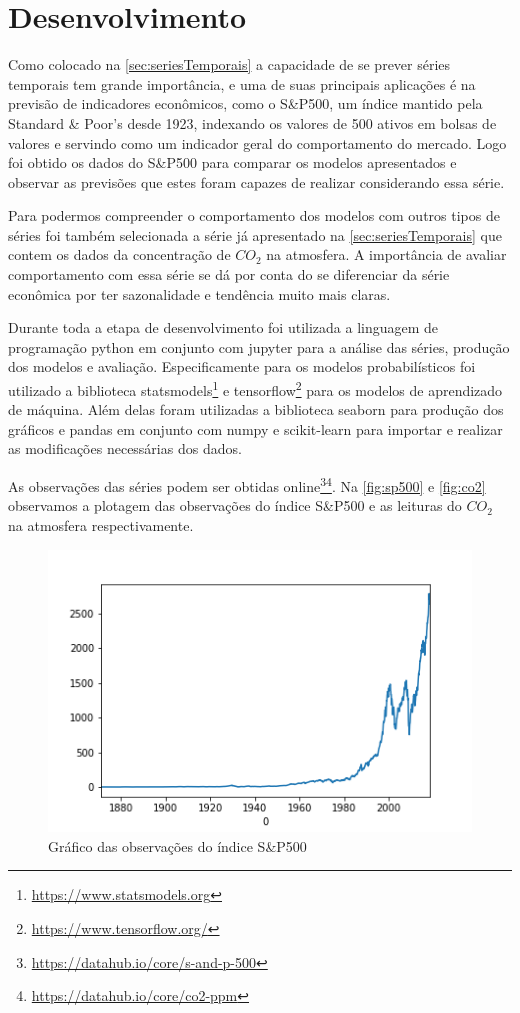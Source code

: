 \documentclass[
    12pt,
    oneside,
    a4paper,
    english,
    brazil
]{abntex2}
\begin{document}
\chapter{Desenvolvimento}\label{chap:desenv}
Como colocado na \autoref{sec:seriesTemporais} a capacidade de se prever séries temporais tem  grande importância,  e uma  de suas  principais aplicações  é na
previsão  de indicadores  econômicos, como  o S\&P500,  um índice  mantido pela
Standard \& Poor's desde 1923, indexando os  valores de 500 ativos em bolsas de
valores e  servindo como um indicador  geral do comportamento do  mercado. Logo
foi obtido os dados do S\&P500 para comparar os modelos apresentados e observar
as previsões que estes foram capazes de realizar considerando essa série.

Para   podermos   compreender   o   comportamento  dos   modelos   com   outros
tipos   de  séries   foi  também   selecionada  a   série  já   apresentado  na
\autoref{sec:seriesTemporais} que contem os dados  da concentração de $CO_2$ na
atmosfera. A  importância de  avaliar comportamento  com essa  série se  dá por
conta do  se diferenciar da  série econômica  por ter sazonalidade  e tendência
muito mais claras.

Durante  toda  a  etapa  de   desenvolvimento  foi  utilizada  a  linguagem  de
programação python em conjunto com jupyter  para a análise das séries, produção
dos modelos  e avaliação. Especificamente  para os modelos  probabilísticos foi
utilizado a  biblioteca statsmodels\footnote{\url{https://www.statsmodels.org}}
e  tensorflow\footnote{\url{https://www.tensorflow.org/}}  para os  modelos  de
aprendizado de máquina.  Além delas foram utilizadas a  biblioteca seaborn para
produção  dos gráficos  e  pandas em  conjunto com  numpy  e scikit-learn  para
importar e realizar as modificações necessárias dos dados.

As observações das séries podem ser obtidas
online\footnote{\url{https://datahub.io/core/s-and-p-500}}\footnote{\url{https://datahub.io/core/co2-ppm}}.
Na   \autoref{fig:sp500}  e   \autoref{fig:co2}  observamos   a  plotagem   das
observações  do   índice  S\&P500  e   as  leituras  do  $CO_2$   na  atmosfera
respectivamente.

\begin{figure}[ht]
    \centering
    \caption{Gráfico das observações do índice S\&P500}\label{fig:sp500}
    \includegraphics[width=.5\linewidth]{images/sp500.png}
\end{figure}
\end{document}
